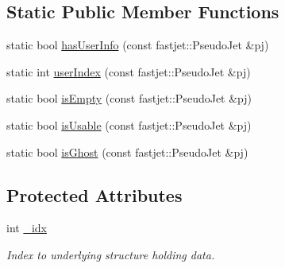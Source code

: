 \subsection*{Static Public Member Functions}
\begin{DoxyCompactItemize}
\item 
static bool \hyperlink{classAnalysis_1_1FastJet_1_1UserInfo_a681f1076b15320ea55e7104b4fe01c3a}{has\+User\+Info} (const fastjet\+::\+Pseudo\+Jet \&pj)
\item 
static int \hyperlink{classAnalysis_1_1FastJet_1_1UserInfo_a767f93f891d045f209198cdf72fddf36}{user\+Index} (const fastjet\+::\+Pseudo\+Jet \&pj)
\item 
static bool \hyperlink{classAnalysis_1_1FastJet_1_1UserInfo_a79ba59c5af9a4bc2e641ab2e54e8d50b}{is\+Empty} (const fastjet\+::\+Pseudo\+Jet \&pj)
\item 
static bool \hyperlink{classAnalysis_1_1FastJet_1_1UserInfo_a18b23aae344587ff280a046e70af1d29}{is\+Usable} (const fastjet\+::\+Pseudo\+Jet \&pj)
\item 
static bool \hyperlink{classAnalysis_1_1FastJet_1_1UserInfo_a4682fdc7e258328293b05951f55cc7a1}{is\+Ghost} (const fastjet\+::\+Pseudo\+Jet \&pj)
\end{DoxyCompactItemize}
\subsection*{Protected Attributes}
\begin{DoxyCompactItemize}
\item 
int \hyperlink{classAnalysis_1_1FastJet_1_1UserInfo_ad9aa33e317aea2b675493b664cc718a3}{\+\_\+idx}
\begin{DoxyCompactList}\small\item\em Index to underlying structure holding data. \end{DoxyCompactList}\end{DoxyCompactItemize}
